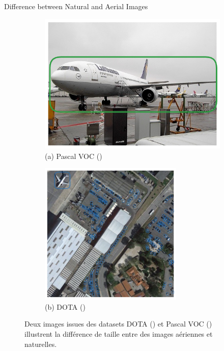 \begin{subsectionframemod}{Difference between Natural and Aerial Images}

    \begin{figure}
        \begin{subfigure}{0.3\textwidth}
            \includegraphics[width=\textwidth]{Figures/voc}\\
            \tiny(a) Pascal VOC (\cite{everingham2010pascal})
        \end{subfigure}
        \hspace{1cm}
        \begin{subfigure}{0.3\textwidth}
            \includegraphics[width=0.75\textwidth]{Figures/dota}\\
            \tiny(b) DOTA (\cite{xia2018dota})
        \end{subfigure}
        \vspace{-1mm}
        \caption{Deux images issues des datasets DOTA (\cite{xia2018dota}) et Pascal VOC (\cite{everingham2010pascal}) illustrent la différence de taille entre des images aériennes et naturelles.}
    \end{figure}
    \vspace{-5mm}


\end{subsectionframemod}

